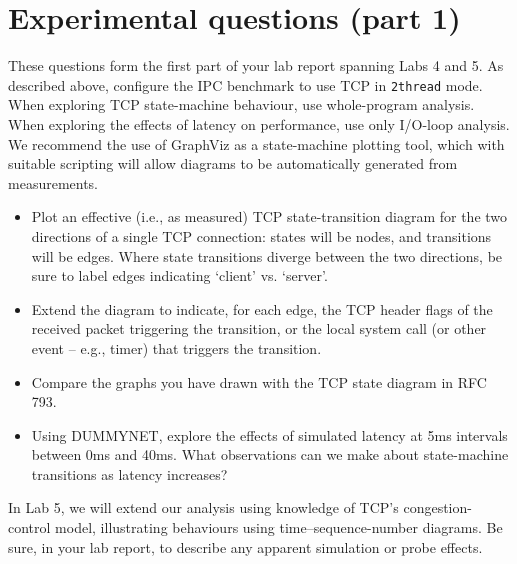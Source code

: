 \documentclass[a4paper,10pt]{article}
\begin{document}
\section*{Experimental questions (part 1)}

These questions form the first part of your lab report spanning Labs 4 and 5.
As described above, configure the IPC benchmark to use TCP in \texttt{2thread}
mode.
When exploring TCP state-machine behaviour, use whole-program analysis.
When exploring the effects of latency on performance, use only I/O-loop
analysis.
We recommend the use of GraphViz as a state-machine plotting tool, which with
suitable scripting will allow diagrams to be automatically generated from
measurements.

\begin{itemize}
  \item Plot an effective (i.e., as measured) TCP state-transition diagram for
    the two directions of a single TCP connection: states will be nodes, and
    transitions will be edges.
    Where state transitions diverge between the two directions, be sure to
    label edges indicating `client' vs. `server'.

  \item Extend the diagram to indicate, for each edge, the TCP header flags
    of the received packet triggering the transition, or the local system call
    (or other event -- e.g., timer) that triggers the transition.

  \item Compare the graphs you have drawn with the TCP state diagram in RFC
    793.

  \item Using DUMMYNET, explore the effects of simulated latency at 5ms
    intervals between 0ms and 40ms.
    What observations can we make about state-machine transitions as latency
    increases?
\end{itemize}

\noindent
In Lab 5, we will extend our analysis using knowledge of TCP's
congestion-control model, illustrating behaviours using time--sequence-number
diagrams.
Be sure, in your lab report, to describe any apparent simulation or probe
effects.
\end{document}
